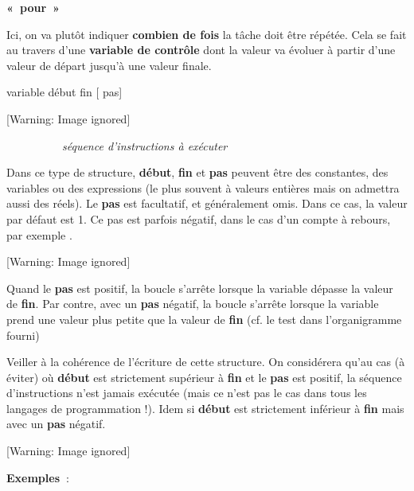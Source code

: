 {\sffamily\bfseries
«~pour~»}

{
Ici, on va plutôt indiquer \textbf{combien de fois} la tâche doit être
répétée. Cela se fait au travers d'une
\textbf{variable de contrôle} dont la valeur va évoluer à partir
d'une valeur de départ jusqu'à une
valeur finale.}

{\sffamily
{} variable  début
 fin [ pas]
}

\begin{center}
 [Warning: Image ignored] %

\end{center}
{\sffamily
\ \ \ \ \ \ \ \ \ \ \textit{séquence d’instructions à exécuter }}

{\sffamily
{}}


\bigskip

{
Dans ce type de structure, \textbf{début}, \textbf{fin} et \textbf{pas}
peuvent être des constantes, des variables ou des expressions (le plus
souvent à valeurs entières mais on admettra aussi des réels). Le
\textbf{pas} est facultatif, et généralement omis. Dans ce cas, la
valeur par défaut est 1. Ce pas est parfois négatif, dans le cas
d'un compte à rebours, par exemple
.}

\begin{center}
 [Warning: Image ignored] %

\end{center}
{
Quand le \textbf{pas} est positif, la boucle s'arrête
lorsque la variable dépasse la valeur de \textbf{fin}. Par contre, avec
un \textbf{pas} négatif, la boucle s'arrête lorsque la
variable prend une valeur plus petite que la valeur de \textbf{fin}
(cf. le test dans l'organigramme fourni)}

{
Veiller à la cohérence de l’écriture de cette structure. On considérera
qu’au cas (à éviter) où \textbf{début} est strictement supérieur à
\textbf{fin} et le \textbf{pas} est positif, la séquence d’instructions
n’est jamais exécutée (mais ce n’est pas le cas dans tous les langages
de programmation !). Idem si \textbf{début} est strictement inférieur à
\textbf{fin} mais avec un \textbf{pas} négatif.}

\begin{center}
 [Warning: Image ignored] %

\end{center}
{
\textbf{Exemples~}:}

